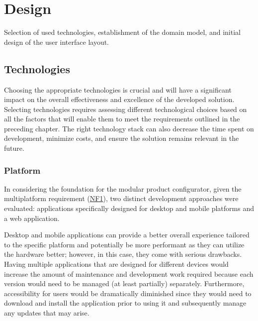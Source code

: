 \chapter{Design}

\begin{chapterabstract}
Selection of used technologies, establishment of the domain model, and initial design of the user interface layout.
\end{chapterabstract}


\section{Technologies}

Choosing the appropriate technologies is crucial and will have a significant impact on the overall effectiveness and excellence of the developed solution. Selecting technologies requires assessing different technological choices based on all the factors that will enable them to meet the requirements outlined in the preceding chapter. The right technology stack can also decrease the time spent on development, minimize costs, and ensure the solution remains relevant in the future.


\subsection{Platform}

In considering the foundation for the modular product configurator, given the multiplatform requirement (\hyperref[itm:NF1]{NF1}), two distinct development approaches were evaluated: applications specifically designed for desktop and mobile platforms and a web application.

Desktop and mobile applications can provide a better overall experience tailored to the specific platform and potentially be more performant as they can utilize the hardware better; however, in this case, they come with serious drawbacks. Having multiple applications that are designed for different devices would increase the amount of maintenance and development work required because each version would need to be managed (at least partially) separately. Furthermore, accessibility for users would be dramatically diminished since they would need to download and install the application prior to using it and subsequently manage any updates that may arise.

